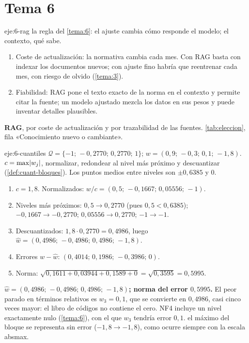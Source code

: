 \section{Tema 6}

\begin{solucion}{eje:6-rag}
\planteamiento la regla del \cref{tema:6}: el ajuste cambia cómo responde el modelo; el contexto, qué sabe.
\pasos
\begin{enumerate}[label=\arabic*.]
  \item Coste de actualización: la normativa cambia cada mes. Con RAG basta con indexar los documentos nuevos; con ajuste fino habría que reentrenar cada mes, con riesgo de olvido (\cref{tema:3}).
  \item Fiabilidad: RAG pone el texto exacto de la norma en el contexto y permite citar la fuente; un modelo ajustado mezcla los datos en sus pesos y puede inventar detalles plausibles.
\end{enumerate}
\resultado \textbf{RAG}, por coste de actualización y por trazabilidad de las fuentes.
\comprobacion \cref{tab:eleccion}, fila «Conocimiento nuevo o cambiante».
\end{solucion}

\begin{solucion}{eje:6-cuantiles}
\datos $\mathcal{Q}=\{-1;\,-0{,}2770;\,0{,}2770;\,1\}$; $w=(0{,}9;\,-0{,}3;\,0{,}1;\,-1{,}8)$.
\planteamiento $c=\max\lvert w_j\rvert$, normalizar, redondear al nivel más próximo y descuantizar (\cref{def:cuant-bloques}). Los puntos medios entre niveles son $\pm 0{,}6385$ y $0$.
\pasos
\begin{enumerate}[label=\arabic*.]
  \item $c=1{,}8$. Normalizados: $w/c=(0{,}5;\,-0{,}1667;\,0{,}05556;\,-1)$.
  \item Niveles más próximos: $0{,}5\to 0{,}2770$ (pues $0{,}5<0{,}6385$); $-0{,}1667\to-0{,}2770$; $0{,}05556\to 0{,}2770$; $-1\to-1$.
  \item Descuantizados: $1{,}8\cdot 0{,}2770=0{,}4986$, luego $\hat w=(0{,}4986;\,-0{,}4986;\,0{,}4986;\,-1{,}8)$.
  \item Errores $w-\hat w$: $(0{,}4014;\,0{,}1986;\,-0{,}3986;\,0)$.
  \item Norma: $\sqrt{0{,}1611+0{,}03944+0{,}1589+0}=\sqrt{0{,}3595}=0{,}5995$.
\end{enumerate}
\resultado \textbf{$\hat w=(0{,}4986;\,-0{,}4986;\,0{,}4986;\,-1{,}8)$; norma del error $0{,}5995$.} El peor parado en términos relativos es $w_3=0{,}1$, que se convierte en $0{,}4986$, casi cinco veces mayor: el libro de códigos no contiene el cero. NF4 incluye un nivel exactamente nulo (\cref{tema:6}), con el que $w_3$ tendría error $0{,}1$.
\comprobacion el máximo del bloque se representa sin error ($-1{,}8\to-1{,}8$), como ocurre siempre con la escala absmax.
\end{solucion}

